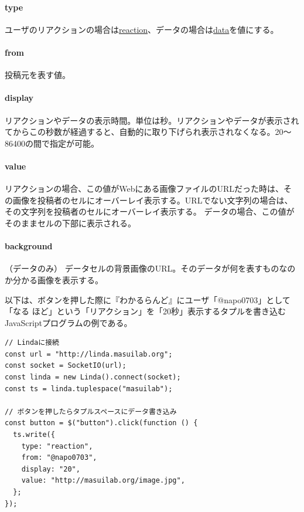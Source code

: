 \vspace{4mm}
\paragraph*{type}
ユーザのリアクションの場合は\url{reaction}、データの場合は\url{data}を値にする。

\vspace{4mm}
\paragraph*{from}
投稿元を表す値。

\vspace{2mm}
\paragraph*{display}
リアクションやデータの表示時間。単位は秒。リアクションやデータが表示されてからこの秒数が経過すると、自動的に取り下げられ表示されなくなる。20〜86400の間で指定が可能。

\vspace{2mm}
\paragraph*{value}
リアクションの場合、この値がWebにある画像ファイルのURLだった時は、その画像を投稿者のセルにオーバーレイ表示する。URLでない文字列の場合は、その文字列を投稿者のセルにオーバーレイ表示する。
データの場合、この値がそのままセルの下部に表示される。

\vspace{4mm}
\paragraph*{background}（データのみ）
データセルの背景画像のURL。そのデータが何を表すものなのか分かる画像を表示する。

\vspace{2mm}
以下は、ボタンを押した際に『わかるらんど』にユーザ「@napo0703」として「なる ほど」という「リアクション」を「20秒」表示するタプルを書き込むJavaScriptプログラムの例である。

\vspace{2mm}
\begin{verbatim}
// Lindaに接続
const url = "http://linda.masuilab.org";
const socket = SocketIO(url);
const linda = new Linda().connect(socket);
const ts = linda.tuplespace("masuilab");

// ボタンを押したらタプルスペースにデータ書き込み
const button = $("button").click(function () {
  ts.write({
    type: "reaction",
    from: "@napo0703",
    display: "20",
    value: "http://masuilab.org/image.jpg",
  };
});
\end{verbatim}
\vspace{2mm}

